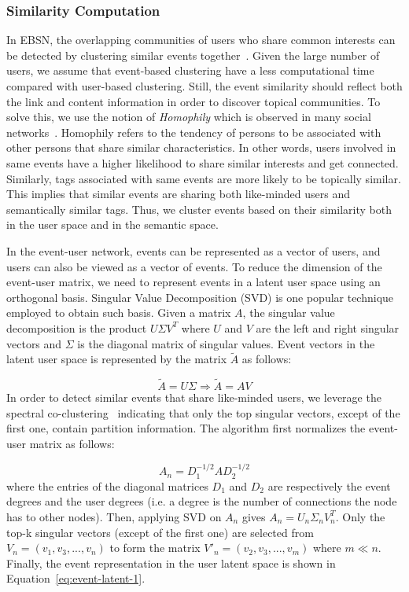 \subsubsection{Similarity Computation}  \label{sec:similarity}
In EBSN, the overlapping communities of users who share common interests can be detected by clustering similar events together~\cite{Li:dasfa11a}. Given the large number of users, we assume that event-based clustering have a less computational time compared with user-based clustering.  Still, the event similarity should reflect both the link and content information in order to discover topical communities. To solve this, we use the notion of \emph{Homophily} which is observed in many social networks~\cite{McPherson:2001}. Homophily refers to the tendency of persons to be associated with other persons that share similar characteristics. In other words, users involved in same events have a higher likelihood to share similar interests and get connected. Similarly, tags associated with same events are more likely to be topically similar. This implies that similar events are sharing both like-minded users and semantically similar tags. Thus, we cluster events based on their similarity both in the user space and in the semantic space.

In the event-user network, events can be represented as a vector of users, and users can also be viewed as a vector of events. To reduce the dimension of the event-user matrix, we need to represent events in a latent user space using an orthogonal basis. Singular Value Decomposition (SVD) is one popular technique employed to obtain such basis.  Given a matrix $A$, the singular value decomposition is the product  $U \Sigma V^T$ where $U$ and $V$ are the left and right singular vectors and $\Sigma$ is the diagonal matrix of singular values. Event vectors in the latent user space is represented by the matrix $\tilde{A}$ as follows:

\begin{equation}  \label{eq:event-latent}
\tilde{A}=U\Sigma \Rightarrow  \tilde{A}=AV
\end{equation}
In order to detect similar events that share like-minded users, we leverage the spectral co-clustering~\cite{Dhillon:KDD01} indicating that only the top singular vectors, except of the first one, contain partition information. The algorithm first normalizes the event-user matrix as follows: 

\begin{equation}  \label{eq:event-latent}
A_n=D_1^{-1/2} A D_2^{-1/2} 
\end{equation}
where the entries of the diagonal matrices $D_{1} $ and $D_{2}$ are respectively the event degrees and the user degrees (i.e. a degree is the number of connections the node has to other nodes). Then, applying SVD on $A_n$ gives $A_n=U_n \Sigma_n V_n^T$.  Only the top-k singular vectors (except of the first one) are selected from $V_n=(v_1, v_3,...,v_n)$ to form the matrix $V'_n=(v_2, v_3,...,v_m)$ where $m \ll n$. Finally, the event representation in the user latent space is shown in Equation~\ref{eq:event-latent-1}.

